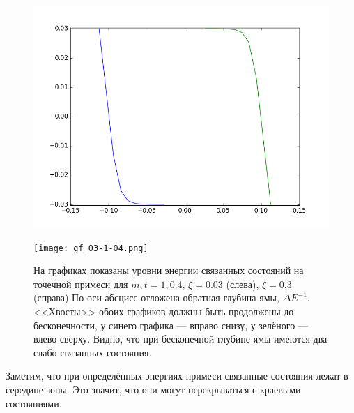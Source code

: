 \begin{figure}[h]
    \centering
    \begin{minipage}[t]{0.45\linewidth}
        \includegraphics[width=0.8\linewidth]{impurity_levels.png}
    \end{minipage}
    \hfill
    \begin{minipage}[t]{0.45\linewidth}
        \texttt{[image: gf\_03-1-04.png]}
    \end{minipage}
        \caption{
                На графиках показаны уровни энергии связанных состояний на точечной примеси
                для $m,t = 1,0.4$, $\xi = 0.03$ (слева), $\xi = 0.3$ (справа)
                По оси абсцисс отложена обратная глубина ямы, $\Delta E^{-1}$. <<Хвосты>>
                обоих графиков должны быть продолжены до бесконечности, у синего графика ---
                вправо снизу, у зелёного --- влево сверху. Видно,
                что при бесконечной глубине ямы имеются два слабо связанных состояния.
                }
    \label{fig:impurity_numeric_levels}
\end{figure}

Заметим, что при определённых энергиях примеси связанные состояния лежат в середине 
зоны. Это значит, что они могут перекрываться с краевыми состояниями.
